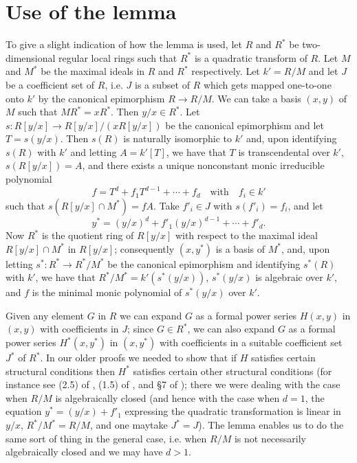 \section{Use of the lemma}\label{art01-sec3}

To give a slight indication of how the lemma is used, let $R$ and $R^{*}$ be two-dimensional regular local rings such that $R^{*}$ is a quadratic transform of $R$. Let $M$ and $M^{*}$ be the maximal ideals in $R$ and $R^{*}$ respectively. Let $k'=R/M$ and let $J$ be a coefficient set of $R$, i.e. $J$ is a subset of $R$ which gets mapped one-to-one onto $k'$ by the canonical epimorphism $R\to R/M$. We can take a basis $(x,y)$ of $M$ such that $MR^{*}=xR^{*}$. Then $y/x\in R^{*}$. Let $s:R[y/x]\to R[y/x]/(xR[y/x])$ be the canonical epimorphism and let $T=s(y/x)$. Then $s(R)$ is naturally isomorphic to $k'$ and, upon identifying $s(R)$ with $k'$ and letting $A=k'[T]$, we have that $T$ is transcendental over $k'$, $s(R[y/x])=A$, and there exists a unique nonconstant monic irreducible polynomial
$$
f=T^{d}+f_{1}T^{d-1}+\cdots+f_{d}\text{~~ with~~ } f_{i}\in k'
$$
such that $s(R[y/x]\cap M^{*})=fA$. Take $f'_{i}\in J$ with $s(f'_{i})=f_{i}$, and let 
$$
y^{*}=(y/x)^{d}+f'_{1}(y/x)^{d-1}+\cdots+f'_{d}.
$$
Now $R^{*}$ is the quotient ring of $R[y/x]$ with respect to the maximal ideal $R[y/x]\cap M^{*}$ in $R[y/x]$; consequently $(x,y^{*})$ is a basis of $M^{*}$, and, upon letting $s^{*}:R^{*}\to R^{*}/M^{*}$ be the canonical epimorphism and identifying $s^{*}(R)$ with $k'$, we have that $R^{*}/M^{*}=k'(s^{*}(y/x))$, $s^{*}(y/x)$ is algebraic over $k'$, and $f$ is the minimal monic polynomial of $s^{*}(y/x)$ over $k'$.

Given any element $G$ in $R$ we can expand $G$ as a formal power series $H(x,y)$ in $(x,y)$ with coefficients in $J$; since $G\in R^{*}$, we can also expand $G$ as a formal power series $H^{*}(x,y^{*})$ in $(x,y^{*})$ with coefficients in a suitable coefficient set $J^{*}$ of $R^{*}$. In our older proofs we needed to show that if $H$ satisfies certain structural conditions then $H^{*}$ satisfies certain other structural conditions (for instance see (2.5) of \cite{art01-key4}, (1.5) of \cite{art01-key5}, and \S7 of \cite{art01-key11}); there we were dealing with the case when $R/M$ is algebraically closed (and hence with the case when $d=1$, the equation $y^{*}=(y/x)+f'_{1}$ expressing the quadratic transformation is linear in $y/x$, $R^{*}/M^{*}=R/M$, and one may\pageoriginale take $J^{*}=J$). The lemma enables us to do the same sort of thing in the general case, i.e. when $R/M$ is not necessarily algebraically closed and we may have $d>1$.

